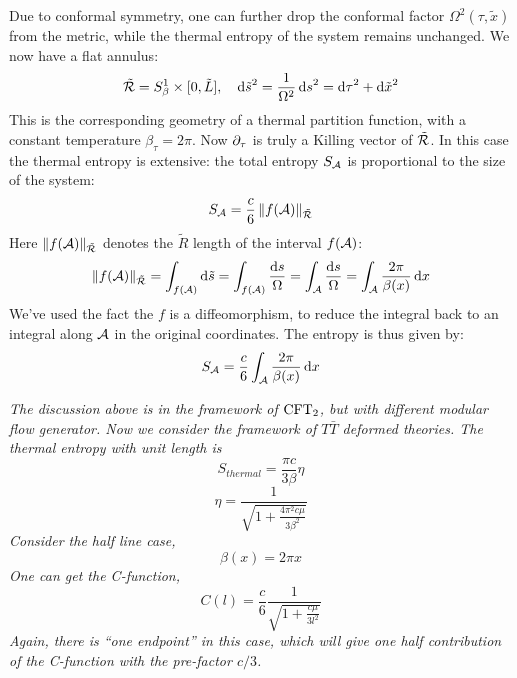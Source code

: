 \documentclass[11pt,a4paper]{article}
\begin{document}
	Due to conformal symmetry, one can further drop the conformal factor $\Omega^2(\tau,\tilde{x})$ from the metric, while the thermal entropy of the system remains unchanged. We now have a flat annulus:
	\begin{equation}
		\tilde{\mathcal{R}}
		= S^1_\beta \times [0,\tilde{L}],
	\quad
		\dd{\tilde{s}}^2
		= \frac{1}{\Omega^2} \dd{s}^2
		= \dd{\tau}^2 + \dd{\tilde{x}}^2
	\end{equation}
	This is the corresponding geometry of a thermal partition function, with a constant temperature $\beta_\tau = 2\pi$. 
	Now $\partial_{\tau}$ is truly a Killing vector of $\tilde{\mathcal{R}}$. 
	In this case the thermal entropy is extensive: the total entropy $S_{\mathcal{A}}$ is proportional to the size of the system:
	\begin{equation}
		S_{\mathcal{A}}
		= \frac{c}{6}\,\norm{f(\mathcal{A})}_{\tilde{\mathcal{R}}}
	\end{equation}
	Here $\norm{f(\mathcal{A})}_{\tilde{\mathcal{R}}}$ denotes the $\tilde{R}$ length of the interval $f(\mathcal{A})$:
	\begin{equation}
		\norm{f(\mathcal{A})}_{\tilde{\mathcal{R}}}
		= \int_{f(\mathcal{A})} \dd{\tilde{s}}
		= \int_{f(\mathcal{A})} \frac{\dd{s}}{\Omega}
		= \int_{\mathcal{A}} \frac{\dd{s}}{\Omega}
		= \int_{\mathcal{A}} \frac{2\pi}{\beta(x)} \dd{x}
	\end{equation}
	We've used the fact the $f$ is a diffeomorphism, to reduce the integral back to an integral along $\mathcal{A}$ in the original coordinates. 
	The entropy is thus given by:
	\begin{equation}
		S_{\mathcal{A}}
		= \frac{c}{6}
			\int_{\mathcal{A}} \frac{2\pi}{\beta(x)} \dd{x}
	\end{equation}
	
	
	
\pagebreak
\textit{
	The discussion above is in the framework of $\mathrm{CFT}_2$, but with different modular flow generator. Now we consider the framework of $T\bar{T}$ deformed theories. The thermal entropy with unit length is
	\begin{equation}
	S_{thermal}=\frac{\pi c}{3\beta}\eta
	\end{equation}
	\begin{equation}
	\eta=\frac{1}{\sqrt{1+\frac{4\pi^2c\mu}{3\beta^2}}}
	\end{equation}
	Consider the half line case,
	\begin{equation}
	\beta(x)=2\pi x
	\end{equation}
	One can get the C-function,
	\begin{equation}
	C(l)=\frac{c}{6}\frac{1}{\sqrt{1+\frac{c\mu}{3l^2}}}
	\end{equation}
	Again, there is ``one endpoint'' in this case, which will give one half contribution of the C-function with the pre-factor $c/3$.
}
	
\end{document}
